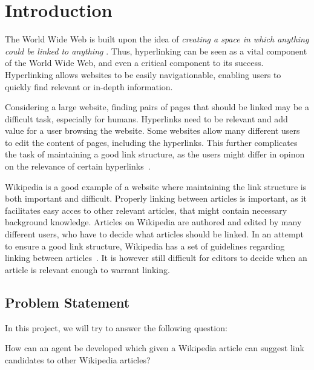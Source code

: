 \chapter{Introduction}
The World Wide Web is built upon the idea of \emph{creating a space in which anything could be linked to anything} \cite[ch.~1, p.~4]{Weaving-the-web}. Thus, hyperlinking can be seen as a vital component of the World Wide Web, and even a critical component to its success. Hyperlinking allows websites to be easily navigationable, enabling users to quickly find relevant or in-depth information.

Considering a large website, finding pairs of pages that should be linked may be a difficult task, especially for humans. Hyperlinks need to be relevant and add value for a user browsing the website. Some websites allow many different users to edit the content of pages, including the hyperlinks. This further complicates the task of maintaining a good link structure, as the users might differ in opinon on the relevance of certain hyperlinks~\cite{ellis1994measurement}.

Wikipedia is a good example of a website where maintaining the link structure is both important and difficult. Properly linking between articles is important, as it facilitates easy acces to other relevant articles, that might contain necessary background knowledge. Articles on Wikipedia are authored and edited by many different users, who have to decide what articles should be linked. In an attempt to ensure a good link structure, Wikipedia has a set of guidelines regarding linking between articles~\cite{wiki-editor-guidelines}. It is however still difficult for editors to decide when an article is relevant enough to warrant linking.



\section{Problem Statement}

In this project, we will try to answer the following question:

\begin{formal}
How can an agent be developed which given a Wikipedia article can suggest link candidates to other Wikipedia articles?
\end{formal}


